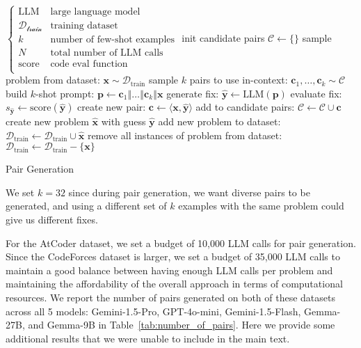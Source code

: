 \documentclass[11pt, a4paper, logo, copyright]{googledeepmind}
\begin{document}
\begin{algorithm}[H]
\begin{algorithmic}[1]
\Require
$\left\{\begin{array}{ll}
\text{LLM} & \text{large language model} \\
\mathcal{D_\text{train}} & \text{training dataset}\\
k & \text{number of few-shot examples} \\
N & \text{total number of LLM calls} \\
\text{score} & \text{code eval function} \\
\end{array}
\right.$
\State init candidate pairs $\mathcal{C} \gets \{\}$
\State sample problem from dataset: $\bm{x} \sim \mathcal{D}_{\text{train}}$
\State sample $k$ pairs to use in-context: $\bm{c}_1, \ldots, \bm{c}_k \sim \mathcal{C}$
\State build $k$-shot prompt: $\bm{p} \gets \bm{c}_1 \mathbin\Vert \ldots \mathbin\Vert \bm{c}_k \mathbin\Vert \bm{x}$
\State generate fix: $\bm{\hat{y}} \gets \text{LLM}(\bm{p})$
\State evaluate fix: $s_{\bm{\hat{y}}} \gets \text{score}(\bm{\hat{y}})$
    \State create new pair: $\bm{c} \gets \langle \bm{x}, \bm{\hat{y}} \rangle$
    \State add to candidate pairs: $\mathcal{C} \gets \mathcal{C} \cup \bm{c}$
        \State create new problem $\bm{\hat{x}}$ with guess $\bm{\hat{y}}$
        \State add new problem to dataset: $\mathcal{D}_\text{train} \gets \mathcal{D}_\text{train} \cup \bm{\hat{x}}$
    \Else
        \State remove all instances of problem from dataset: $\mathcal{D}_\text{train} \gets \mathcal{D}_\text{train} - \{ \bm{x} \}$
    \EndIf
\EndIf
\EndFor
\Statex {}
\end{algorithmic}
\caption{Pair Generation}
\label{alg:pair_generation}
\end{algorithm}


We set $k = 32$ since during pair generation, we want diverse pairs to be generated, and using a different set of $k$ examples with the same problem could give us different fixes.

For the AtCoder dataset, we set a budget of 10,000 LLM calls for pair generation. Since the CodeForces dataset is larger, we set a budget of 35,000 LLM calls to maintain a good balance between having enough LLM calls per problem and maintaining the affordability of the overall approach in terms of computational resources. We report the number of pairs generated on both of these datasets across all 5 models: Gemini-1.5-Pro, GPT-4o-mini, Gemini-1.5-Flash, Gemma-27B, and Gemma-9B in Table~\ref{tab:number_of_pairs}. Here we provide some additional results that we were unable to include in the main text.
\end{document}
